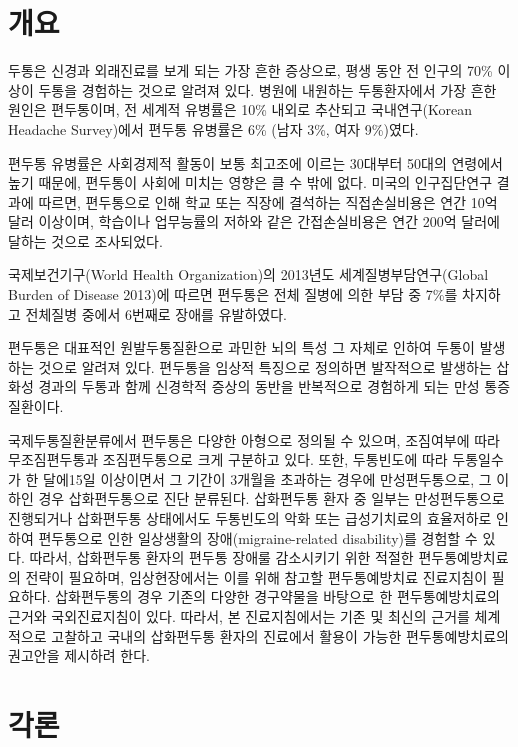 \documentclass[]{book}
\begin{document}
\hypertarget{section-6}{%
\chapter{개요}\label{section-6}}

두통은 신경과 외래진료를 보게 되는 가장 흔한 증상으로, 평생 동안 전 인구의 70\% 이상이 두통을 경험하는 것으로 알려져 있다. 병원에 내원하는 두통환자에서 가장 흔한 원인은 편두통이며, 전 세계적 유병률은 10\% 내외로 추산되고 국내연구(Korean Headache Survey)에서 편두통 유병률은 6\% (남자 3\%, 여자 9\%)였다.

편두통 유병률은 사회경제적 활동이 보통 최고조에 이르는 30대부터 50대의 연령에서 높기 때문에, 편두통이 사회에 미치는 영향은 클 수 밖에 없다. 미국의 인구집단연구 결과에 따르면, 편두통으로 인해 학교 또는 직장에 결석하는 직접손실비용은 연간 10억 달러 이상이며, 학습이나 업무능률의 저하와 같은 간접손실비용은 연간 200억 달러에 달하는 것으로 조사되었다.

국제보건기구(World Health Organization)의 2013년도 세계질병부담연구(Global Burden of Disease 2013)에 따르면 편두통은 전체 질병에 의한 부담 중 7\%를 차지하고 전체질병 중에서 6번째로 장애를 유발하였다.

편두통은 대표적인 원발두통질환으로 과민한 뇌의 특성 그 자체로 인하여 두통이 발생하는 것으로 알려져 있다. 편두통을 임상적 특징으로 정의하면 발작적으로 발생하는 삽화성 경과의 두통과 함께 신경학적 증상의 동반을 반복적으로 경험하게 되는 만성 통증질환이다.

국제두통질환분류에서 편두통은 다양한 아형으로 정의될 수 있으며, 조짐여부에 따라 무조짐편두통과 조짐편두통으로 크게 구분하고 있다. 또한, 두통빈도에 따라 두통일수가 한 달에15일 이상이면서 그 기간이 3개월을 초과하는 경우에 만성편두통으로, 그 이하인 경우 삽화편두통으로 진단 분류된다. 삽화편두통 환자 중 일부는 만성편두통으로 진행되거나 삽화편두통 상태에서도 두통빈도의 악화 또는 급성기치료의 효율저하로 인하여 편두통으로 인한 일상생활의 장애(migraine-related disability)를 경험할 수 있다. 따라서, 삽화편두통 환자의 편두통 장애룰 감소시키기 위한 적절한 편두통예방치료의 전략이 필요하며, 임상현장에서는 이를 위해 참고할 편두통예방치료 진료지침이 필요하다. 삽화편두통의 경우 기존의 다양한 경구약물을 바탕으로 한 편두통예방치료의 근거와 국외진료지침이 있다. 따라서, 본 진료지침에서는 기존 및 최신의 근거를 체계적으로 고찰하고 국내의 삽화편두통 환자의 진료에서 활용이 가능한 편두통예방치료의 권고안을 제시하려 한다.

\hypertarget{section-7}{%
\chapter{각론}\label{section-7}}
\end{document}
